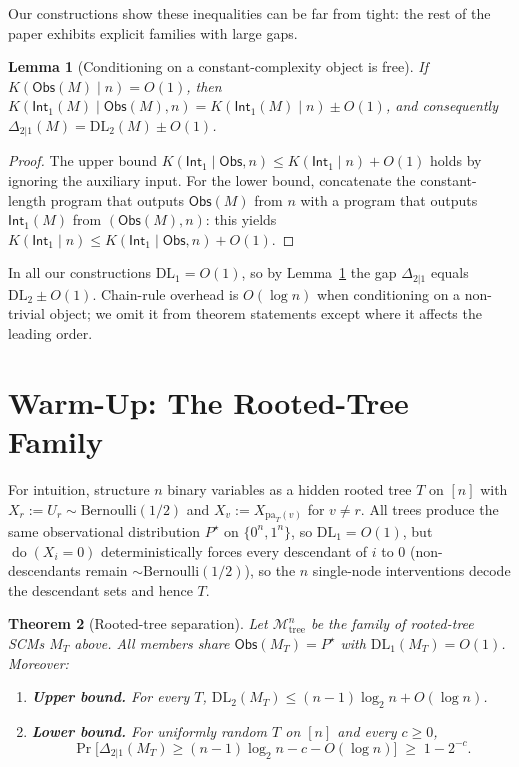 \documentclass{article}
\theoremstyle{plain}
\newtheorem{theorem}{Theorem}[section]
\newtheorem{lemma}[theorem]{Lemma}
\theoremstyle{definition}
\newcommand{\calM}{\mathcal{M}}
\newcommand{\Obs}{\mathsf{Obs}}
\newcommand{\Int}{\mathsf{Int}}
\newcommand{\DL}{\mathrm{DL}}
\newcommand{\pa}{\mathrm{pa}}
\DeclareMathOperator{\doop}{do}
\begin{document}
Our constructions show these inequalities can be far from tight: the rest of the paper exhibits explicit families with large gaps.

\begin{lemma}[Conditioning on a constant-complexity object is free]
\label{lem:conditioning-simple}
If $K(\Obs(M) \mid n) = O(1)$, then $K(\Int_1(M) \mid \Obs(M), n) = K(\Int_1(M) \mid n) \pm O(1)$, and consequently $\Delta_{2|1}(M) = \DL_2(M) \pm O(1)$.
\end{lemma}

\begin{proof}[Proof]
The upper bound $K(\Int_1 \mid \Obs, n) \leq K(\Int_1 \mid n) + O(1)$ holds by ignoring the auxiliary input. For the lower bound, concatenate the constant-length program that outputs $\Obs(M)$ from $n$ with a program that outputs $\Int_1(M)$ from $(\Obs(M), n)$: this yields $K(\Int_1 \mid n) \leq K(\Int_1 \mid \Obs, n) + O(1)$.
\end{proof}

In all our constructions $\DL_1 = O(1)$, so by Lemma~\ref{lem:conditioning-simple} the gap $\Delta_{2|1}$ equals $\DL_2 \pm O(1)$. Chain-rule overhead is $O(\log n)$ when conditioning on a non-trivial object; we omit it from theorem statements except where it affects the leading order.

\section{Warm-Up: The Rooted-Tree Family}
\label{sec:warmup}

For intuition, structure $n$ binary variables as a hidden rooted tree $T$ on $[n]$ with $X_r := U_r \sim \mathrm{Bernoulli}(1/2)$ and $X_v := X_{\pa_T(v)}$ for $v \neq r$. All trees produce the same observational distribution $P^\star$ on $\{0^n, 1^n\}$, so $\DL_1 = O(1)$, but $\doop(X_i = 0)$ deterministically forces every descendant of $i$ to $0$ (non-descendants remain $\sim \mathrm{Bernoulli}(1/2)$), so the $n$ single-node interventions decode the descendant sets and hence $T$.

\begin{theorem}[Rooted-tree separation]
\label{thm:tree-main}
Let $\calM_{\mathrm{tree}}^n$ be the family of rooted-tree SCMs $M_T$ above. All members share $\Obs(M_T) = P^\star$ with $\DL_1(M_T) = O(1)$. Moreover:
\begin{enumerate}
    \item \textbf{Upper bound.} For every $T$, $\DL_2(M_T) \leq (n-1)\log_2 n + O(\log n)$.
    \item \textbf{Lower bound.} For uniformly random $T$ on $[n]$ and every $c \geq 0$,
    \[
        \Pr\!\bigl[\Delta_{2|1}(M_T) \geq (n-1)\log_2 n - c - O(\log n)\bigr] \;\geq\; 1 - 2^{-c}.
    \]
\end{enumerate}
\end{theorem}
\end{document}
